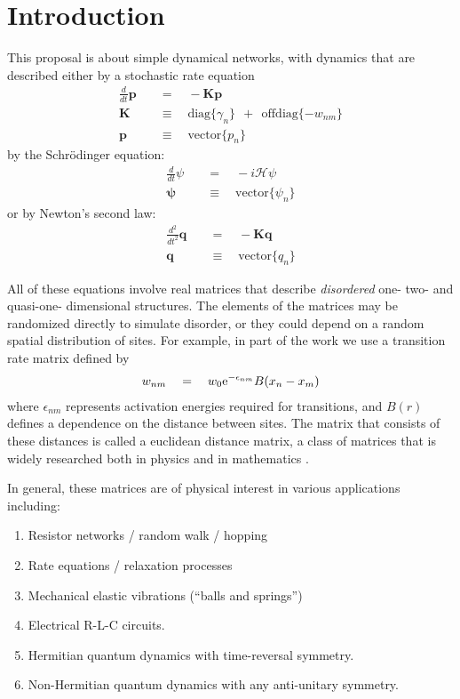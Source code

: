 \chapter{Introduction}\label{sec:matrices}


This proposal is about simple dynamical networks, with dynamics
that are described either by a stochastic rate equation
%
\begin{align}
  \frac{d}{dt}\mathbf{p} \quad &= \quad -\mathbf{K} \mathbf{p} \\
  \mathbf{K} \quad &\equiv \quad \textrm{diag}\{ \gamma_n \} \ \ +\ \ \textrm{offdiag}\{ -w_{nm} \} \\
  \mathbf{p} \quad &\equiv \quad \textrm{vector}\{ p_n \}
\end{align}
%
by the Schr\"{o}dinger equation:
%
\begin{align}
  \frac{d}{dt}\psi \quad &= \quad -i \mathcal{H}\psi \\
  \mathbf{\psi} \quad &\equiv \quad \textrm{vector}\{ \psi_n \}
\end{align}
%
or by Newton's second law:
%
\begin{align}
  \frac{d^2}{dt^2}\mathbf{q} \quad &= \quad -\mathbf{K} \mathbf{q} \\
  \mathbf{q} \quad &\equiv \quad \textrm{vector}\{ q_n \}
\end{align}
%

All of these equations 
involve {\rm real} matrices that describe {\em disordered} 
one- two- and quasi-one- dimensional structures. The elements of
the matrices may be randomized directly to simulate disorder, or they
could depend on a random spatial distribution of sites. For example, in 
part of the work we use a transition rate matrix defined by
%
\begin{align}
w_{nm} \quad = \quad w_0 \mbox{e}^{-\epsilon_{nm}}B(x_n-x_m)
\end{align}
%
where $\epsilon_{nm}$ represents activation energies required for transitions,
and $B(r)$ defines a dependence on the distance between sites. The matrix
that consists of these distances is called a euclidean distance matrix, 
a class of matrices that is widely researched both in physics and in mathematics 
\cite{skipetrov_eigenvalue_2011, goetschy_non-hermitian_2011,mezard_spectra_1999, bogomolny_spectral_2003}.

In general, these matrices 
are of physical interest in various applications including:

\begin{enumerate}[label={\Alph*.}]
\item Resistor networks / random walk / hopping 
\item Rate equations / relaxation processes 
\item Mechanical elastic vibrations (``balls and springs'')
\item Electrical R-L-C circuits.
\item Hermitian quantum dynamics with time-reversal symmetry. 
\item Non-Hermitian quantum dynamics with any anti-unitary symmetry. 
\end{enumerate}

